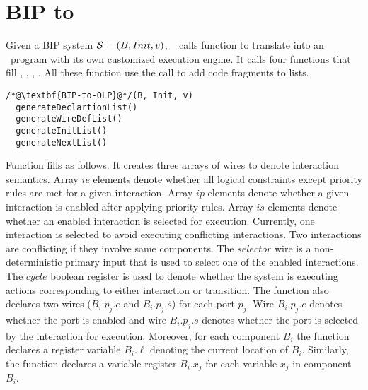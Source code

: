 
\section{BIP to \caig}
\label{sec:bip2aig}

Given a BIP system $\mathcal{S} = (B, Init, v)$, \biptool~
calls function   to translate \Pm into 
an \caig~program with its own customized execution engine. 
It calls four functions 
that fill , , , . 
All these function use the  call to add code fragments to lists. 

\begin{lstlisting}
/*@\textbf{BIP-to-OLP}@*/(B, Init, v)
  generateDeclartionList()
  generateWireDefList()
  generateInitList()
  generateNextList()
\end{lstlisting}

Function  fills  as follows. 
It creates three arrays of wires to denote interaction semantics. 
Array $ie$ elements denote whether all logical constraints except priority rules are met for a given interaction. 
Array $ip$ elements denote whether a given interaction is enabled after applying priority rules. 
Array $is$ elements denote whether an enabled interaction is selected for execution. 
Currently, one interaction is selected to avoid executing conflicting interactions. 
Two interactions are conflicting if they involve same components. 
The $selector$ wire is a non-deterministic primary input that is used to select one of the enabled interactions. 
The $cycle$ boolean register is used to denote whether the system is executing actions corresponding to either interaction or transition. 
The function also declares two wires ($B_i.p_j.e$ and $B_i.p_j.s$) for each port $p_j$. 
Wire $B_i.p_j.e$ denotes whether the port is enabled and wire $B_i.p_j.s$ denotes whether the port is selected by the interaction for execution. 
Moreover, for each component $B_i$ the function declares a register variable $B_i.\ell$ denoting the current location of $B_i$. 
Similarly, the function declares a variable register $B_i.x_j$ for each variable $x_j$ in component $B_i$.  

